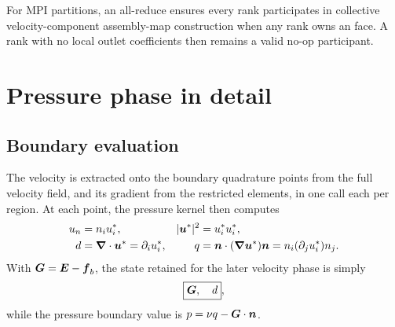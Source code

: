 For MPI partitions, an all-reduce ensures every rank participates in
collective velocity-component assembly-map construction when any rank owns an
\HOutflow{} face.  A rank with no local outlet coefficients then remains a
valid no-op participant.

\section{Pressure phase in detail}

\subsection{Boundary evaluation}

The velocity is extracted onto the boundary quadrature points from the full
velocity field, and its gradient from the restricted elements, in one call
each per region. At each point, the pressure kernel then computes
\begin{align}
  u_n &= n_i u_i^*, &
  \lvert\boldsymbol{u}^*\rvert^2 &= u_i^*u_i^*,\\
  d &= \boldsymbol{\nabla}\cdot\boldsymbol{u}^*=\partial_i u_i^*, &
  q &= \boldsymbol{n}\cdot(\boldsymbol{\nabla}\boldsymbol{u}^*)\boldsymbol{n}
      =n_i(\partial_j u_i^*)n_j.
\end{align}
With $\boldsymbol{G}=\boldsymbol{E}-\boldsymbol{f}_b$, the state retained for the later velocity
phase is simply
\begin{equation}
  \boxed{\boldsymbol{G},\quad d},
\end{equation}
while the pressure boundary value is $p=\nu q-\boldsymbol{G}\cdot\boldsymbol{n}$.

